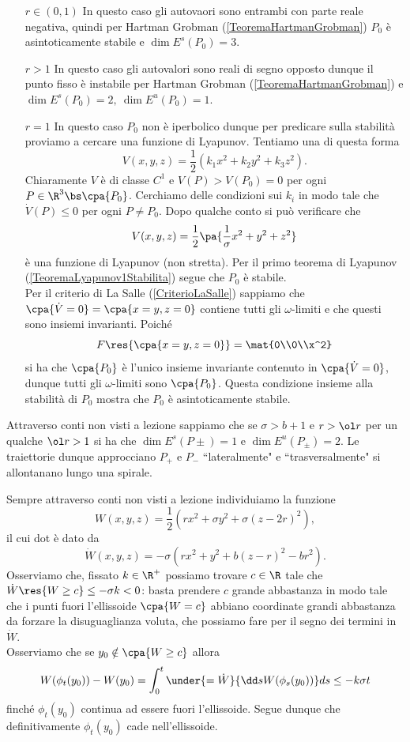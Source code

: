 \begin{itemize}
\item[$\boxed{r\in(0,1)}$] In questo caso gli autovaori sono entrambi con parte reale negativa, quindi per Hartman Grobman (\ref{TeoremaHartmanGrobman}) $P_0$ \`e asintoticamente stabile e $\dim E^s(P_0)=3$.
\item[$\boxed{r>1}$] In questo caso gli autovalori sono reali di segno opposto dunque il punto fisso \`e instabile per Hartman Grobman (\ref{TeoremaHartmanGrobman}) e $\dim E^s(P_0)=2,\ \dim E^u(P_0)=1$.
\item[$\boxed{r=1}$] In questo caso $P_0$ non \`e iperbolico dunque per predicare sulla stabilit\`a proviamo a cercare una funzione di Lyapunov. Tentiamo una di questa forma
\[V(x,y,z)=\frac12(k_1x^2+k_2y^2+k_3z^2).\]
Chiaramente $V$ \`e di classe $C^1$ e $V(P)>V(P_0)=0$ per ogni $P\in\R^3\bs\cpa{P_0}$. Cerchiamo delle condizioni sui $k_i$ in modo tale che $\dot V(P)\leq 0$ per ogni $P\neq P_0$. Dopo qualche conto si pu\`o verificare che
\[V(x,y,z)=\frac12\pa{\frac1\sigma x^2+y^2+z^2}\]
\`e una funzione di Lyapunov (non stretta). Per il primo teorema di Lyapunov (\ref{TeoremaLyapunov1Stabilita}) segue che $P_0$ \`e stabile.\\
Per il criterio di La Salle (\ref{CriterioLaSalle}) sappiamo che $\cpa{\dot V=0}=\cpa{x=y,z=0}$ contiene tutti gli $\omega$-limiti e che questi sono insiemi invarianti. Poich\'e
\[F\res{\cpa{x=y,z=0}}=\mat{0\\0\\x^2}\]
si ha che $\cpa{P_0}$ \`e l'unico insieme invariante contenuto in $\cpa{\dot V=0}$, dunque tutti gli $\omega$-limiti sono $\cpa{P_0}$. Questa condizione insieme alla stabilit\`a di $P_0$ mostra che $P_0$ \`e asintoticamente stabile.
\end{itemize}
\setlength{\leftmargini}{0.5cm}
Attraverso conti non visti a lezione sappiamo che se $\sigma>b+1$ e $r>\ol r$ per un qualche $\ol r>1$ si ha che $\dim E^s(P\pm)=1$ e $\dim E^u(P_\pm)=2$. Le traiettorie dunque approcciano $P_+$ e $P_-$ ``lateralmente" e ``trasversalmente" si allontanano lungo una spirale.

Sempre attraverso conti non visti a lezione individuiamo la funzione
\[W(x,y,z)=\frac12(rx^2+\sigma y^2+\sigma(z-2r)^2),\]
il cui dot \`e dato da
\[\dot W(x,y,z)=-\sigma(rx^2+y^2+b(z-r)^2-br^2).\]
Osserviamo che, fissato $k\in\R^+$ possiamo trovare $c\in\R$ tale che $\dot W\res{W\geq c}\leq -\sigma k<0$: basta prendere $c$ grande abbastanza in modo tale che i punti fuori l'ellissoide $\cpa{W=c}$ abbiano coordinate grandi abbastanza da forzare la disuguaglianza voluta, che possiamo fare per il segno dei termini in $\dot W$.\\
Osserviamo che se $y_0\notin \cpa{W\geq c}$ allora
\[W(\phi_t(y_0))-W(y_0)=\int_0^t\under{=\dot W}{\dd s{}W(\phi_s(y_0))}ds\leq -k\sigma t\]
finch\'e $\phi_t(y_0)$ continua ad essere fuori l'ellissoide. Segue dunque che definitivamente $\phi_t(y_0)$ cade nell'ellissoide.

